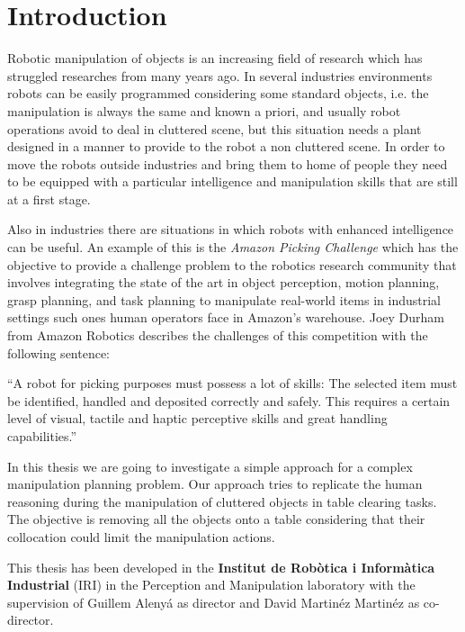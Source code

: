 \chapter{Introduction}
\label{ch:introduction}

Robotic manipulation of objects is an increasing field of research which has struggled researches from many years ago. In several industries environments robots can be easily programmed considering some standard objects, i.e. the manipulation is always the same and known a priori, and usually robot operations avoid to deal in cluttered scene, but this situation needs a plant designed in a manner to provide to the robot a non cluttered scene. In order to move the robots outside industries and bring them to home of people they need to be equipped with a particular intelligence and manipulation skills that are still at a first stage.

Also in industries there are situations in which robots with enhanced intelligence can be useful. An example of this is the \textit{Amazon Picking Challenge} \citep{APC} which has the objective to provide a challenge 
problem to the robotics research community that involves integrating the state of the art in object perception, 
motion planning, grasp planning, and task planning to manipulate real-world items in industrial settings such ones human operators face in Amazon's warehouse. Joey Durham from Amazon Robotics describes the challenges of this competition with the following sentence:
\begin{displayquote}
 “A robot for picking purposes must possess a lot of skills: The selected item must be identified, handled and deposited correctly and safely. This requires a certain level of visual, tactile and haptic perceptive skills and great handling capabilities.”
\end{displayquote}

In this thesis we are going to investigate a simple approach for a complex manipulation planning problem. Our approach tries to replicate the human reasoning during the manipulation of cluttered objects in table clearing tasks. The objective is removing all the objects onto a table considering that their collocation could limit the manipulation actions. 

This thesis has been developed in the \textbf{Institut de Robòtica i Informàtica Industrial} (IRI) in the  Perception and Manipulation laboratory with the supervision of Guillem Alenyá as director and David Martinéz Martinéz as co-director. 

